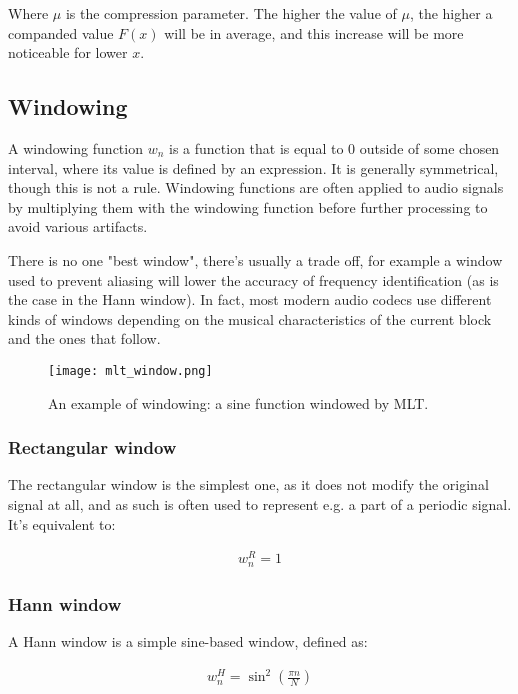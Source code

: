Where $\mu$ is the compression parameter. The higher the value of $\mu$, the higher a companded value $F(x)$ will be in average, and this increase will be more noticeable for lower $x$.

\subsection{Windowing}
A windowing function $w_n$ is a function that is equal to $0$ outside of some chosen interval, where its value is defined by an expression. It is generally symmetrical, though this is not a rule. Windowing functions are often applied to audio signals by multiplying them with the windowing function before further processing to avoid various artifacts.

There is no one "best window", there's usually a trade off, for example a window used to prevent aliasing will lower the accuracy of frequency identification (as is the case in the Hann window). \cite{bosi_goldberg_2003} In fact, most modern audio codecs use different kinds of windows depending on the musical characteristics of the current block and the ones that follow. \cite{Raissi2002TheTB}

\begin{figure}[ht]
	\caption[Windowing example]{An example of windowing: a sine function windowed by MLT.}
	\centering
	\texttt{[image: mlt\_window.png]}
\end{figure}

\subsubsection{Rectangular window}
The rectangular window is the simplest one, as it does not modify the original signal at all, and as such is often used to represent e.g. a part of a periodic signal. It's equivalent to:

\begin{align}
w_n^R = 1
\end{align}

\subsubsection{Hann window}
\label{sec:hann}
A Hann window is a simple sine-based window, defined as:

\begin{align}
w_n^H = \sin^2 \left( \frac{\pi n}{N} \right)
\end{align}

